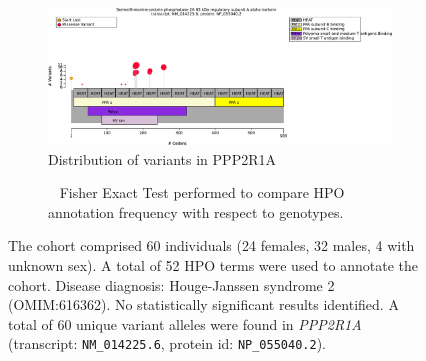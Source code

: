 \begin{figure}[htbp]
\centering
\begin{subfigure}[b]{0.95\textwidth}
\centering
\includegraphics[width=\textwidth]{ img/PPP2R1A_protein_diagram.pdf} 
\captionsetup{justification=raggedright,singlelinecheck=false}
\caption{Distribution of variants in PPP2R1A}
\end{subfigure}

\vspace{2em}

\begin{subfigure}[b]{0.95\textwidth}
\centering
{}
\captionsetup{justification=raggedright,singlelinecheck=false}
\caption{             Fisher Exact Test performed to compare HPO annotation frequency with respect to genotypes. }
\end{subfigure}

\vspace{2em}

\caption{ The cohort comprised 60 individuals (24 females, 32 males, 4 with unknown sex). A total of 52 HPO terms were used to annotate the cohort. Disease diagnosis: Houge-Janssen syndrome 2 (OMIM:616362). No statistically significant results identified. A total of 60 unique variant alleles were found in \textit{PPP2R1A} (transcript: \texttt{NM\_014225.6}, protein id: \texttt{NP\_055040.2}).}
\end{figure}

